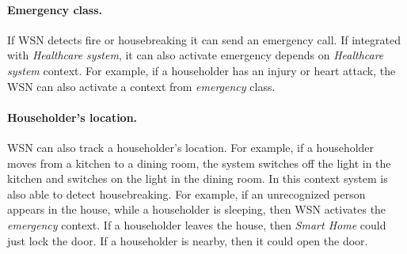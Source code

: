 \documentclass{ubicomp-ext}
\begin{document}

\paragraph{Emergency class.} If WSN detects fire or housebreaking it can send an emergency call. If integrated with \textit{Healthcare system}, it can also activate emergency depends on \textit{Healthcare system} context. For example, if a householder has an injury or heart attack, the WSN can also activate a context from \textit{emergency} class.

\paragraph{Householder's location.} WSN can also track a householder's location. For example, if a householder moves from a kitchen to a dining room, the system switches off the light in the kitchen and switches on the light in the dining room. In this context system is also able to detect housebreaking. For example, if an unrecognized person appears in the house, while a householder is sleeping, then WSN activates the \textit{emergency} context. If a householder leaves the house, then \textit{Smart Home} could just lock the door. If a householder is nearby, then it could open the door.
\end{document}
